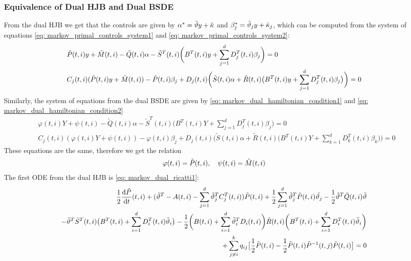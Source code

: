 \subsubsection{Equivalence of Dual HJB and Dual BSDE}
From the dual HJB we get that the controls are given by $\alpha^\ast = \Tilde{\vartheta} y + \Tilde{\kappa}$ and $\beta^\ast_j = \tilde{\vartheta}_j y + \Tilde{\kappa}_j$, which can be computed from the system of equations \eqref{eq: markov_primal_controls_system1} and \eqref{eq: markov_primal_controls_system2}:
\begin{align*}
    &\Tilde{P}(t,i) y + \Tilde{M}(t,i)  - \tilde{Q}(t,i) \alpha - \tilde{S}^T(t,i) \bigg(B^T(t,i) y + \sum_{j=1}^d D_j^T(t,i) \beta_j\bigg) = 0 \\
    &  C_j(t,i)(\Tilde{P}(t,i) y + \Tilde{M}(t,i))  - \Tilde{P}(t,i) \beta_j
    + D_j(t,i) \bigg(\tilde{S} (t,i) \alpha + \tilde{R}(t,i)\big(B^T(t,i) y + \sum_{j=1}^d D_j^T(t,i) \beta_j\big)\bigg) = 0
\end{align*}
Similarly, the system of equations from the dual BSDE are given by \eqref{eq: markov_dual_hamiltonian_condition1} and \eqref{eq: markov_dual_hamiltonian_condition2}
\begin{align*}
    & \varphi(t,i) Y + \psi(t,i) - \tilde{Q}(t,i)\alpha - \tilde{S}^T(t,i) \bigg(B^T(t,i) Y + \sum_{j=1}^d D_j^T(t,i) \beta_j \bigg) = 0 \\
    &C_j(t,i) (\varphi(t,i) Y + \psi(t,i)) - \varphi(t,i)\beta_j + D_j (t,i) \bigg( \tilde{S}(t,i) \alpha +  \tilde{R}(t,i)\big(B^T(t,i) Y + \sum_{k=1}^d D_k^T(t,i) \beta_k \big) \bigg) = 0 
\end{align*}
These equations are the same, therefore we get the relation
\begin{equation*}
    \varphi(t,i) = \Tilde{P}(t,i), \quad \psi(t,i) = \Tilde{M}(t,i)
\end{equation*}
The first ODE from the dual HJB is \eqref{eq: markov_dual_ricatti1}:
\begin{align*}
    \frac12 \frac{\mathop{}\!\mathrm{d} \Tilde{P}}{\mathop{}\!\mathrm{d} t}(t,i) + (\Tilde{\vartheta}^T - A(t,i) - \sum_{j=1}^d \Tilde{\vartheta}_j^T C_j^T(t,i))\Tilde{P}(t,i) + \frac12 \sum_{j=1}^d \Tilde{\vartheta}_j^T \Tilde{P}(t,i) \Tilde{\vartheta_j} - \frac12 \tilde{\vartheta}^T \tilde{Q}(t,i)\tilde{\vartheta}\\
    - \tilde{\vartheta}^T \tilde{S}^T(t,i) \big(B^T(t,i) + \sum_{i=1}^d D_i^T(t,i) \tilde{\vartheta}_i \big)
    - \frac12 \bigg(B(t,i) + \sum_{i=1}^d\tilde{\vartheta}_i^T D_i(t,i)\bigg) \tilde{R}(t,i) \bigg(B^T(t,i) + \sum_{i=1}^d D_i^T(t,i) \tilde{\vartheta}_i\bigg)\\
    + \sum_{j\ne i}^k q_{ij}  \big[ \frac12 \Tilde{P}(t,i) - \frac12 \Tilde{P}(t,i)\Tilde{P}^{-1}(t,j)\Tilde{P}(t,i)\big] = 0
\end{align*}
